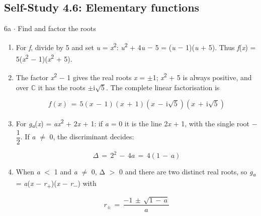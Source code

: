 \documentclass[11pt]{article}
\begin{document}
\begin{keepsection}\subsection{Self-Study 4.6: Elementary functions}

\begin{workedbox}{6a \ensuremath{\cdot} Find and factor the roots}
\begin{enumerate}
\item For \textit{f}, divide by 5 and set \textit{u} = \textit{x}\textsuperscript{2}: \textit{u}\textsuperscript{2} + 4\textit{u} \ensuremath{-} 5 = (\textit{u} \ensuremath{-} 1)(\textit{u} + 5). Thus \textit{f}(\textit{x}) = 5(\textit{x}\textsuperscript{2} \ensuremath{-} 1)(\textit{x}\textsuperscript{2} + 5).
\item {}
The factor \textit{x}\textsuperscript{2} \ensuremath{-} 1 gives the real roots \textit{x} = \ensuremath{\pm}1; \textit{x}\textsuperscript{2} + 5 is always positive, and over \ensuremath{\mathbb{C}} it has the roots \ensuremath{\pm}i\ensuremath{\sqrt{5}}. The complete linear factorisation is

\begin{equation*}{f}({x})\, =\, 5({x}\, -\, 1)({x}\, +\, 1)({x}\, -\, \mathrm{i}\sqrt{5})({x}\, +\, \mathrm{i}\sqrt{5})\end{equation*}
\item {}
For \textit{g}\textsubscript{\textit{a}}(\textit{x}) = \textit{a}\textit{x}\textsuperscript{2} + 2\textit{x} + 1: if \textit{a} = 0 it is the line 2\textit{x} + 1, with the single root \ensuremath{-}{\small\ensuremath{\dfrac{1}{2}}}. If \textit{a} \ensuremath{\neq} 0, the discriminant decides:

\begin{equation*}Δ\, =\, 2^{2}\, -\, 4{a}\, =\, 4(1\, -\, {a})\end{equation*}
\item {}
When \textit{a} \ensuremath{<} 1 and \textit{a} \ensuremath{\neq} 0, Δ \ensuremath{>} 0 and there are two distinct real roots, so \textit{g}\textsubscript{\textit{a}} = \textit{a}(\textit{x} \ensuremath{-} \textit{r}\textsubscript{+})(\textit{x} \ensuremath{-} \textit{r}\textsubscript{\ensuremath{-}}) with

\begin{equation*}{r}_{\pm }\, =\, \dfrac{-1\, \pm \, \sqrt{1\, -\, {a}}}{{a}}\end{equation*}


\end{enumerate}
\end{workedbox}
\end{keepsection}
\end{document}
